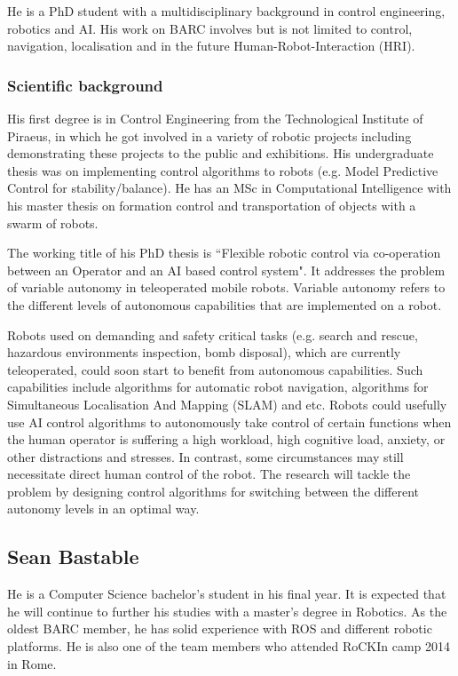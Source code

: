 \documentclass[conference]{IEEEtran}
\begin{document}
He is a PhD student with a multidisciplinary background in control engineering, robotics and AI. His work on BARC involves but is not limited to control, navigation, localisation and in the future Human-Robot-Interaction (HRI).

\subsubsection*{Scientific background}

His first degree is in Control Engineering from the Technological Institute of Piraeus, in which he got involved in a variety of robotic projects including demonstrating these projects to the public and exhibitions. His undergraduate thesis was on implementing control algorithms to robots (e.g. Model Predictive Control for stability/balance). He has an MSc in Computational Intelligence with his master thesis on formation control and transportation of objects with a swarm of robots.  

The working title of his PhD thesis is ``Flexible robotic control via co-operation between an Operator and an AI based control system". It addresses the problem of variable autonomy in teleoperated mobile robots. Variable autonomy refers to the different levels of autonomous capabilities that are implemented on a robot.

Robots used on demanding and safety critical tasks (e.g. search and rescue, hazardous environments inspection, bomb disposal), which are currently teleoperated, could soon start to benefit from autonomous capabilities. Such capabilities include algorithms for automatic robot navigation, algorithms for Simultaneous Localisation And Mapping (SLAM) and etc. Robots could usefully use AI control algorithms to autonomously take control of certain functions when the human operator is suffering a high workload, high cognitive load, anxiety, or other distractions and stresses. In contrast, some circumstances may still necessitate direct human control of the robot. The research will tackle the problem by designing control algorithms for switching between the different autonomy levels in an optimal way. 


\subsection{Sean Bastable}

He is a Computer Science bachelor's student in his final year. It is expected that he will continue to further his studies with a master's degree in Robotics. As the oldest BARC member, he has solid experience with ROS and different robotic platforms. He is also one of the team members who attended RoCKIn camp 2014 in Rome.
\end{document}
